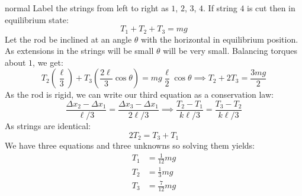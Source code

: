 \begin{solution}{normal}
Label the strings from left to right as $1$, $2$, $3$, $4$. If string $4$ is cut then in equilibrium state:
$$T_1+T_2+T_3 = mg$$Let the rod be inclined at an angle $\theta$ with the horizontal in equilibrium position. As extensions in the strings will be small $\theta$ will be very small. Balancing torques about $1$, we get:
$$
T_2\left(\frac{\ell}{3}\right) + T_3\left(\frac{2\ell}{3}\cos\theta\right) =
mg\frac{\ell}{2}\cos\theta \implies T_2 + 2T_3
= \frac{3mg}{2}
$$As the rod is rigid, we can write our third equation as a conservation law:
$$\frac{\Delta x_2 - \Delta x_1}{\ell/3} = \frac{\Delta x_3 - \Delta x_1}{2\ell/3} \implies \frac{T_2-T_1}{k\ell/3} = \frac{T_3-T_2}{k\ell/3}$$As strings are identical:
$$2T_2 = T_3+T_1$$We have three equations and three unknowns so solving them yields:
\begin{align*}
T_1 &= \frac{1}{12} mg \\
T_2 &= \frac{1}{3} mg \\
T_3 &= \frac{7}{12} mg \\
\end{align*}
\end{solution}
